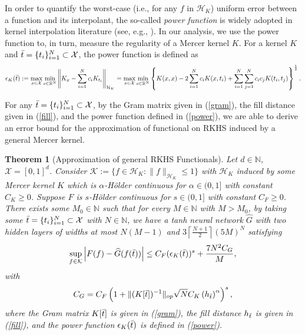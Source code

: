 \documentclass{article}
\def\NN{\mathbb N}
\def\RR{\mathbb R}
\numberwithin{equation}{section}
\newtheorem{theorem}{Theorem}[section]
\begin{document}
In order to quantify the worst-case (i.e., for any $f$ in ${\mathcal{H}_K}$) uniform error between a function and its interpolant, the so-called {\it power function} is widely adopted in kernel interpolation literature (see, e.g., \citep{fasshauer2005meshfree, pazouki2011bases, kanagawa2018gaussian}). In our analysis, we use the power function to, in turn, measure the regularity of a Mercer kernel $K$. For a kernel $K$ and $\Bar{t}=\{t_i\}_{i=1}^N \subset \mathcal{X}$, the power function is defined as 
\begin{equation}\label{power}
    \epsilon_K(\Bar{t}):= \max_{x\in \mathcal{X}} \min_{c\in\RR^N} \left\|K_x -  \sum_{i=1}^N c_i  K_{t_i}\right\|_{\mathcal{H}_K} 
    = \max_{x\in \mathcal{X}} \min_{c\in\RR^N} \left\{ K(x,x) -2 \sum_{i=1}^N c_i K(x,t_i)+ \sum_{i=1}^N \sum_{j=1}^N c_i  c_j K(t_i, t_j)\right\}^{\frac{1}{2}}. 
\end{equation}

For any $\Bar{t} = \{t_i\}_{i=1}^N \subset \mathcal{X}$, by the Gram matrix given in (\ref{gram}), the fill distance given in (\ref{fill}), and the power function defined in (\ref{power}), we are able to derive an error bound for the approximation of functional on RKHS induced by a general Mercer kernel. 

\begin{theorem}[Approximation of general RKHS Functionals]\label{thm:general}
    Let $d\in \NN$, $\mathcal{X} = [0,1]^d$. 
    Consider $
    \mathcal{K} := \{f\in \mathcal{H}_K: \|f\|_{\mathcal{H}_K} \leq 1\}
$ with $\mathcal{H}_K$ induced by some Mercer kernel $K$ which is $\alpha$-H\"{o}lder continuous for $\alpha \in (0, 1]$ with constant $C_K \geq 0$. 
Suppose $F$ is  $s$-H\"{o}lder continuous for $s \in (0,1]$ with constant $C_F \geq 0$. 
    There exists some $M_0\in \NN$ such that for every $M\in \NN$ with $M>M_0$, by taking some
    $\Bar{t}=\{t_i\}_{i=1}^N \subset \mathcal{X}$ with $N\in \NN$, we have a tanh neural network $\widehat{G}$ with two hidden layers of widths at most $N(M-1)$ and $3\left\lceil\frac{N+1}{2}\right\rceil (5M)^N$ satisfying 
\begin{equation}\label{thm:general_bound}
    \sup_{f\in \mathcal{K}}\left|F(f) - \widehat{G}(f(\Bar{t}))\right|\leq  C_F (\epsilon_K(\Bar{t}))^s + \frac{7N^2C_G}{M},
\end{equation}
with $$C_G = C_F\left(1+ \|(K[\Bar{t}])^{-1 }\|_{op}\sqrt{N} C_K \left(h_{\Bar{t}}\right)^\alpha\right)^s,$$ 
where the Gram matrix $K[\Bar{t}]$ is given in (\ref{gram}), the fill distance $h_{\Bar{t}}$ is given in (\ref{fill}), and the power function $\epsilon_K(\Bar{t})$ is defined in (\ref{power}). 
\end{theorem}
\end{document}

